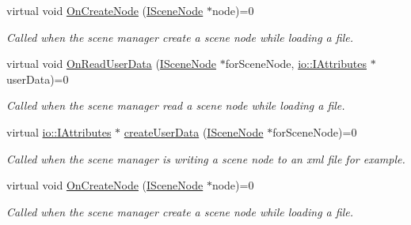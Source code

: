 \begin{DoxyCompactItemize}
\item 
\mbox{\label{classirr_1_1scene_1_1ISceneUserDataSerializer_af025f0c9ee60be56d91f34bc9ab15115}} 
virtual void \hyperlink{classirr_1_1scene_1_1ISceneUserDataSerializer_af025f0c9ee60be56d91f34bc9ab15115}{On\+Create\+Node} (\hyperlink{classirr_1_1scene_1_1ISceneNode}{I\+Scene\+Node} $\ast$node)=0
\begin{DoxyCompactList}\small\item\em Called when the scene manager create a scene node while loading a file. \end{DoxyCompactList}\item 
virtual void \hyperlink{classirr_1_1scene_1_1ISceneUserDataSerializer_a48276bde0e05343d39ec25c6933f122d}{On\+Read\+User\+Data} (\hyperlink{classirr_1_1scene_1_1ISceneNode}{I\+Scene\+Node} $\ast$for\+Scene\+Node, \hyperlink{classirr_1_1io_1_1IAttributes}{io\+::\+I\+Attributes} $\ast$user\+Data)=0
\begin{DoxyCompactList}\small\item\em Called when the scene manager read a scene node while loading a file. \end{DoxyCompactList}\item 
virtual \hyperlink{classirr_1_1io_1_1IAttributes}{io\+::\+I\+Attributes} $\ast$ \hyperlink{classirr_1_1scene_1_1ISceneUserDataSerializer_a8d276882257602ffc03a23a38290ea44}{create\+User\+Data} (\hyperlink{classirr_1_1scene_1_1ISceneNode}{I\+Scene\+Node} $\ast$for\+Scene\+Node)=0
\begin{DoxyCompactList}\small\item\em Called when the scene manager is writing a scene node to an xml file for example. \end{DoxyCompactList}\item 
\mbox{\label{classirr_1_1scene_1_1ISceneUserDataSerializer_af025f0c9ee60be56d91f34bc9ab15115}} 
virtual void \hyperlink{classirr_1_1scene_1_1ISceneUserDataSerializer_af025f0c9ee60be56d91f34bc9ab15115}{On\+Create\+Node} (\hyperlink{classirr_1_1scene_1_1ISceneNode}{I\+Scene\+Node} $\ast$node)=0
\begin{DoxyCompactList}\small\item\em Called when the scene manager create a scene node while loading a file. \end{DoxyCompactList}\item 

\end{DoxyCompactItemize}
